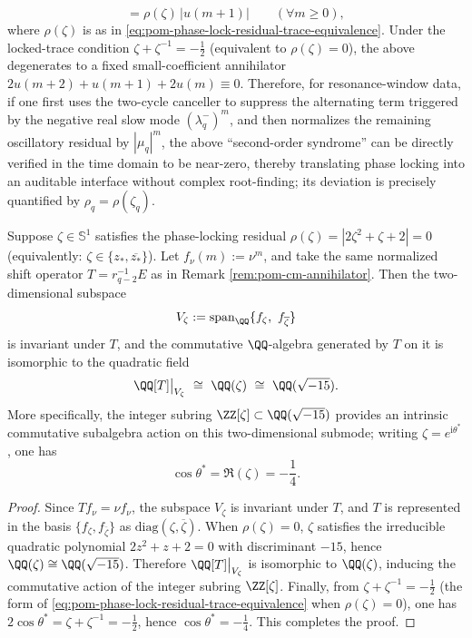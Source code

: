 \begin{remark}
\[=\rho(\zeta)\,|u(m+1)|\qquad(\forall m\ge 0),
\]
where \(\rho(\zeta)\) is as in \eqref{eq:pom-phase-lock-residual-trace-equivalence}.
Under the locked-trace condition \(\zeta+\zeta^{-1}=-\tfrac12\) (equivalent to \(\rho(\zeta)=0\)), the above degenerates to a fixed small-coefficient annihilator
\(
2u(m+2)+u(m+1)+2u(m)\equiv 0
\).
Therefore, for resonance-window data, if one first uses the two-cycle canceller to suppress the alternating term triggered by the negative real slow mode \((\lambda_q^-)^m\), and then normalizes the remaining oscillatory residual by \(|\mu_q|^m\), the above ``second-order syndrome'' can be directly verified in the time domain to be near-zero, thereby translating phase locking into an auditable interface without complex root-finding; its deviation is precisely quantified by \(\rho_q=\rho(\zeta_q)\).
\end{remark}

\begin{proposition}\label{prop:pom-cm-rigidity-qsqrtm15}
Suppose \(\zeta\in\mathbb{S}^1\) satisfies the phase-locking residual \(\rho(\zeta)=|2\zeta^2+\zeta+2|=0\) (equivalently: \(\zeta\in\{z_\ast,\overline{z_\ast}\}\)).
Let \(f_\nu(m):=\nu^m\), and take the same normalized shift operator \(T=r_{q-2}^{-1}E\) as in Remark \ref{rem:pom-cm-annihilator}.
Then the two-dimensional subspace
\[
V_\zeta:=\mathrm{span}_{\QQ}\{f_\zeta,\ f_{\overline{\zeta}}\}
\]
is invariant under \(T\), and the commutative \(\QQ\)-algebra generated by \(T\) on it is isomorphic to the quadratic field
\[
\QQ[T]\big|_{V_\zeta}\ \cong\ \QQ(\zeta)\ \cong\ \QQ(\sqrt{-15}).
\]
More specifically, the integer subring \(\ZZ[\zeta]\subset \QQ(\sqrt{-15})\) provides an intrinsic commutative subalgebra action on this two-dimensional submode; writing \(\zeta=e^{\mathrm{i}\theta^\ast}\), one has
\[
\cos\theta^\ast=\Re(\zeta)=-\frac14.
\]
\end{proposition}
\begin{proof}
Since \(Tf_\nu=\nu f_\nu\), the subspace \(V_\zeta\) is invariant under \(T\), and \(T\) is represented in the basis \(\{f_\zeta,f_{\overline{\zeta}}\}\) as \(\mathrm{diag}(\zeta,\overline{\zeta})\).
When \(\rho(\zeta)=0\), \(\zeta\) satisfies the irreducible quadratic polynomial \(2z^2+z+2=0\) with discriminant \(-15\), hence \(\QQ(\zeta)\cong \QQ(\sqrt{-15})\).
Therefore \(\QQ[T]\big|_{V_\zeta}\) is isomorphic to \(\QQ(\zeta)\), inducing the commutative action of the integer subring \(\ZZ[\zeta]\).
Finally, from \(\zeta+\zeta^{-1}=-\tfrac12\) (the form of \eqref{eq:pom-phase-lock-residual-trace-equivalence} when \(\rho(\zeta)=0\)), one has
\(
2\cos\theta^\ast=\zeta+\zeta^{-1}=-\tfrac12
\),
hence \(\cos\theta^\ast=-\tfrac14\). This completes the proof.
\end{proof}

